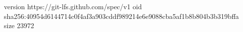 version https://git-lfs.github.com/spec/v1
oid sha256:40954d6144714c0f4af3a903cddf989214e6e9088cba5af1b8b804b3b319bffa
size 23972
